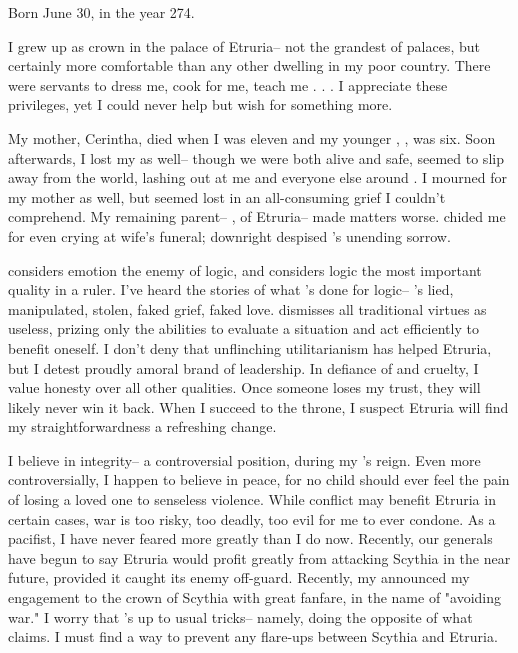\documentclass[char]{Kos}
\begin{document}
\name{\cGroom{}}

Born June 30, in the year 274.

I grew up as crown \cGroom{\prince} in the palace of Etruria-- not the grandest of palaces, but certainly more comfortable than any other dwelling in my poor country. There were servants to dress me, cook for me, teach me . . . I appreciate these privileges, yet I could never help but wish for something more.

My mother, Cerintha, died when I was eleven and my younger \cPoet{\sibling}, \cPoet{}, was six. Soon afterwards, I lost my \cPoet{\sibling} as well-- though we were both alive and safe, \cPoet{\they} seemed to slip away from the world, lashing out at me and everyone else around \cPoet{\them}. I mourned for my mother as well, but \cPoet{\they} seemed lost in an all-consuming grief I couldn't comprehend. My remaining parent-- \cEtruriaKing{}, \cEtruriaKing{\Monarch} of Etruria-- made matters worse. \cEtruriaKing{\They} chided me for even crying at \cEtruriaKing{\their} wife's funeral; \cEtruriaKing{\they} downright despised \cPoet{}'s unending sorrow. 

\cEtruriaKing{\Parent} considers emotion the enemy of logic, and \cEtruriaKing{\they} considers logic the most important quality in a ruler. I've heard the stories of what \cEtruriaKing{\they}'s done for logic-- \cEtruriaKing{\they}'s lied, manipulated, stolen, faked grief, faked love. \cEtruriaKing{\They} dismisses all traditional virtues as useless, prizing only the abilities to evaluate a situation and act efficiently to benefit oneself. I don't deny that \cEtruriaKing{\their} unflinching utilitarianism has helped Etruria, but I detest \cEtruriaKing{\their} proudly amoral brand of leadership. In defiance of \cEtruriaKing{\them} and \cEtruriaKing{\their} cruelty, I value honesty over all other qualities. Once someone loses my trust, they will likely never win it back. When I succeed to the throne, I suspect Etruria will find my straightforwardness a refreshing change.

I believe in integrity-- a controversial position, during my \cEtruriaKing{\parent}'s reign. Even more controversially, I happen to believe in peace, for no child should ever feel the pain of losing a loved one to senseless violence. While conflict may benefit Etruria in certain cases, war is too risky, too deadly, too evil for me to ever condone. As a pacifist, I have never feared more greatly than I do now. Recently, our generals have begun to say Etruria would profit greatly from attacking Scythia in the near future, provided it caught its enemy off-guard. Recently, my \cEtruriaKing{\parent} announced my engagement to the crown \cBride{\prince} of Scythia with great fanfare, in the name of "avoiding war." I worry that \cEtruriaKing{\Parent}'s up to \cEtruriaKing{\their} usual tricks-- namely, doing the opposite of what \cEtruriaKing{\they} claims. I must find a way to prevent any flare-ups between Scythia and Etruria.
\end{document}
